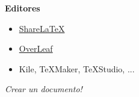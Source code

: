 \begin{frame}
\centering
\textbf{Editores}
\begin{itemize}
\item \href{https://www.sharelatex.com}{ShareLaTeX}
\item \href{https://www.overleaf.com/}{OverLeaf}
\item Kile, TeXMaker, TeXStudio, ...
\end{itemize}
\vspace{1.4cm}
\textit{Crear un documento!}
\end{frame}

